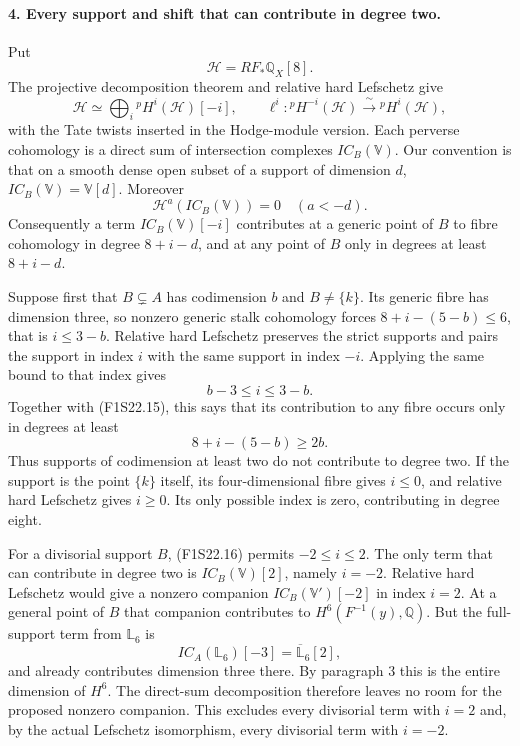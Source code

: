 \paragraph{4. Every support and shift that can contribute in degree two.}
Put
\[
                     \mathcal H=RF_*\mathbb Q_X[8].
 \tag{F1S22.13}
\]
The projective decomposition theorem and relative hard
Lefschetz give
\[
 \mathcal H\simeq\bigoplus_i{}^pH^i(\mathcal H)[-i],
 \qquad
 \ell^i:{}^pH^{-i}(\mathcal H)
                     \xrightarrow{\ \sim\ }{}^pH^i(\mathcal H),
 \tag{F1S22.14}
\]
with the Tate twists inserted in the Hodge-module version.
Each perverse cohomology is a direct sum of intersection
complexes $IC_B(\mathbb V)$. Our convention is that on a
smooth dense open subset of a support of dimension $d$,
$IC_B(\mathbb V)=\mathbb V[d]$. Moreover
\[
             \mathcal H^a(IC_B(\mathbb V))=0\quad(a<-d).
 \tag{F1S22.15}
\]
Consequently a term $IC_B(\mathbb V)[-i]$ contributes at
a generic point of $B$ to fibre cohomology in degree
$8+i-d$, and at any point of $B$ only in degrees at
least $8+i-d$.

Suppose first that $B\subsetneq A$ has codimension $b$
and $B\ne\{k\}$. Its generic fibre has dimension three,
so nonzero generic stalk cohomology forces
$8+i-(5-b)\le6$, that is $i\le3-b$.
Relative hard Lefschetz preserves the strict supports
and pairs the support in index $i$ with the same support
in index $-i$. Applying the same bound to that index gives
\[
                   b-3\le i\le3-b.
 \tag{F1S22.16}
\]
Together with (F1S22.15), this says that its contribution
to any fibre occurs only in degrees at least
\[
                         8+i-(5-b)\ge2b.
 \tag{F1S22.17}
\]
Thus supports of codimension at least two do not
contribute to degree two. If the support is the point
$\{k\}$ itself, its four-dimensional fibre gives $i\le0$,
and relative hard Lefschetz gives $i\ge0$. Its only
possible index is zero, contributing in degree eight.

For a divisorial support $B$, (F1S22.16) permits
$-2\le i\le2$. The only term that can contribute in
degree two is $IC_B(\mathbb V)[2]$, namely $i=-2$.
Relative hard Lefschetz would give a nonzero companion
$IC_B(\mathbb V')[-2]$ in index $i=2$. At a general point
of $B$ that companion contributes to $H^6(F^{-1}(y),\mathbb Q)$.
But the full-support term from $\mathbb L_6$ is
\[
          IC_A(\mathbb L_6)[-3]
                 =\overline{\mathbb L}_6[2],
 \tag{F1S22.18}
\]
and already contributes dimension three there. By paragraph
3 this is the entire dimension of $H^6$.
The direct-sum decomposition therefore leaves no room
for the proposed nonzero companion. This excludes every
divisorial term with $i=2$ and, by the actual Lefschetz
isomorphism, every divisorial term with $i=-2$.

